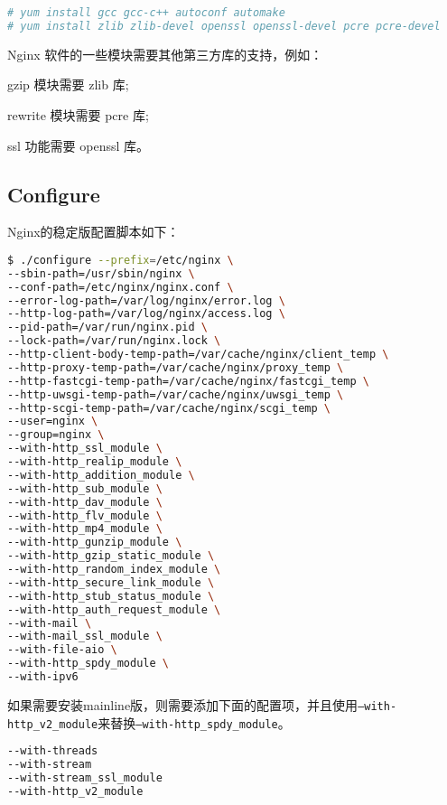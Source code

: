 \begin{lstlisting}[language=bash]
# yum install gcc gcc-c++ autoconf automake
# yum install zlib zlib-devel openssl openssl-devel pcre pcre-devel
\end{lstlisting}


Nginx 软件的一些模块需要其他第三方库的支持，例如：


\begin{compactitem}
\item gzip 模块需要 zlib 库;
\item rewrite 模块需要 pcre 库;
\item ssl 功能需要 openssl 库。
\end{compactitem}



\subsection{Configure}

Nginx的稳定版配置脚本如下：

\begin{lstlisting}[language=bash]
$ ./configure --prefix=/etc/nginx \
--sbin-path=/usr/sbin/nginx \
--conf-path=/etc/nginx/nginx.conf \
--error-log-path=/var/log/nginx/error.log \
--http-log-path=/var/log/nginx/access.log \
--pid-path=/var/run/nginx.pid \
--lock-path=/var/run/nginx.lock \
--http-client-body-temp-path=/var/cache/nginx/client_temp \
--http-proxy-temp-path=/var/cache/nginx/proxy_temp \
--http-fastcgi-temp-path=/var/cache/nginx/fastcgi_temp \
--http-uwsgi-temp-path=/var/cache/nginx/uwsgi_temp \
--http-scgi-temp-path=/var/cache/nginx/scgi_temp \
--user=nginx \
--group=nginx \
--with-http_ssl_module \
--with-http_realip_module \
--with-http_addition_module \
--with-http_sub_module \
--with-http_dav_module \
--with-http_flv_module \
--with-http_mp4_module \
--with-http_gunzip_module \
--with-http_gzip_static_module \
--with-http_random_index_module \
--with-http_secure_link_module \
--with-http_stub_status_module \
--with-http_auth_request_module \
--with-mail \
--with-mail_ssl_module \
--with-file-aio \
--with-http_spdy_module \
--with-ipv6
\end{lstlisting}

如果需要安装mainline版，则需要添加下面的配置项，并且使用\texttt{--with-http\_v2\_module}来替换\texttt{--with-http\_spdy\_module}。

\begin{lstlisting}[language=bash]
--with-threads
--with-stream
--with-stream_ssl_module
--with-http_v2_module
\end{lstlisting}


